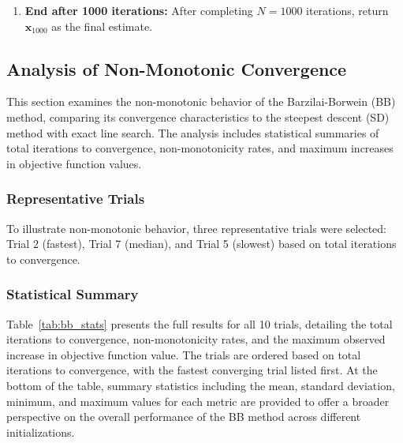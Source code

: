 \documentclass[12pt]{article}
\begin{document}
\begin{enumerate}
\begin{enumerate}
        \item \textbf{Compute the BB step size:}  
        \[
        \alpha_k = \frac{\mathbf{s}_{k}^T \mathbf{s}_{k}}{\mathbf{s}_{k}^T \mathbf{y}_{k}}.
        \]

        \item \textbf{Update the current point:}  
        \[
        \mathbf{x}_{k+1} = \mathbf{x}_k - \alpha_k \mathbf{g}(\mathbf{x}_k).
        \]
    \end{enumerate}

    \item \textbf{End after 1000 iterations:}  
    After completing \( N = 1000 \) iterations, return \( \mathbf{x}_{1000} \) as the final estimate.
\end{enumerate}

\subsection{Analysis of Non-Monotonic Convergence}

This section examines the non-monotonic behavior of the Barzilai-Borwein (BB) method, comparing its convergence characteristics to the steepest descent (SD) method with exact line search. The analysis includes statistical summaries of total iterations to convergence, non-monotonicity rates, and maximum increases in objective function values.

\subsubsection{Representative Trials}

To illustrate non-monotonic behavior, three representative trials were selected: Trial 2 (fastest), Trial 7 (median), and Trial 5 (slowest) based on total iterations to convergence.

\subsubsection{Statistical Summary}

Table~\ref{tab:bb_stats} presents the full results for all 10 trials, detailing the total iterations to convergence, non-monotonicity rates, and the maximum observed increase in objective function value. The trials are ordered based on total iterations to convergence, with the fastest converging trial listed first. At the bottom of the table, summary statistics including the mean, standard deviation, minimum, and maximum values for each metric are provided to offer a broader perspective on the overall performance of the BB method across different initializations.
\end{document}

